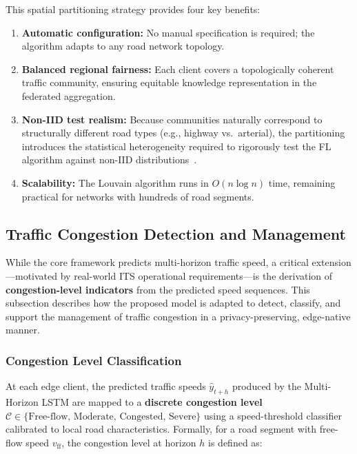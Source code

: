 \documentclass[pdflatex,sn-mathphys-num]{sn-jnl}
\theoremstyle{thmstyleone}
\theoremstyle{thmstyletwo}
\theoremstyle{thmstylethree}
\begin{document}
This spatial partitioning strategy provides four key benefits:

\begin{enumerate}
    \item \textbf{Automatic configuration:} No manual specification is required;
    the algorithm adapts to any road network topology.
    \item \textbf{Balanced regional fairness:} Each client covers a
    topologically coherent traffic community, ensuring equitable knowledge
    representation in the federated aggregation.
    \item \textbf{Non-IID test realism:} Because communities naturally
    correspond to structurally different road types (e.g., highway vs.\
    arterial), the partitioning introduces the statistical heterogeneity
    required to rigorously test the FL algorithm against non-IID
    distributions~\cite{Zhao2018FederatedNonIID}.
    \item \textbf{Scalability:} The Louvain algorithm runs in $O(n \log n)$
    time, remaining practical for networks with hundreds of road segments.
\end{enumerate}

\subsection{Traffic Congestion Detection and Management}

While the core framework predicts multi-horizon traffic speed, a critical
extension---motivated by real-world ITS operational requirements---is the
derivation of \textbf{congestion-level indicators} from the predicted speed
sequences. This subsection describes how the proposed model is adapted to detect,
classify, and support the management of traffic congestion in a
privacy-preserving, edge-native manner.

\subsubsection{Congestion Level Classification}

At each edge client, the predicted traffic speeds $\hat{y}_{t+h}$ produced by
the Multi-Horizon LSTM are mapped to a \textbf{discrete congestion level}
$\mathcal{C} \in \{\text{Free-flow},\, \text{Moderate},\, \text{Congested},\,
\text{Severe}\}$ using a speed-threshold classifier calibrated to local road
characteristics. Formally, for a road segment with free-flow speed
$v_{\mathrm{ff}}$, the congestion level at horizon $h$ is defined as:
\end{document}
